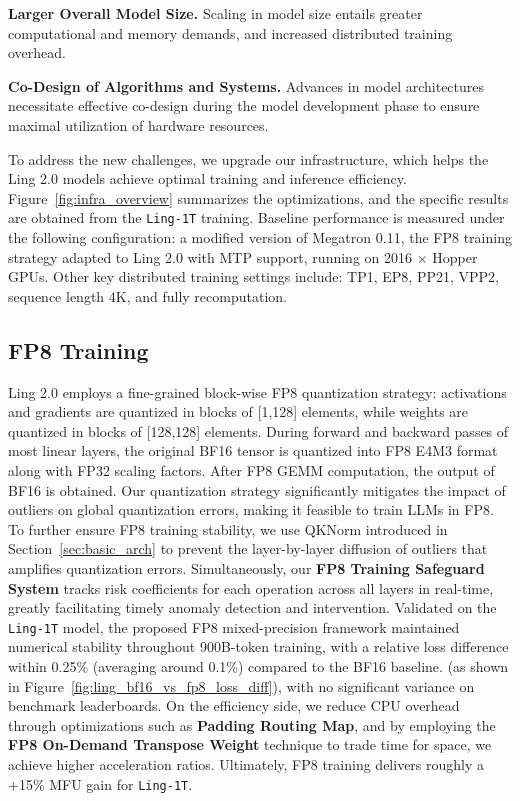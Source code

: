 \textbf{Larger Overall Model Size.} Scaling in model size entails greater computational and memory demands, and increased distributed training overhead.

\textbf{Co-Design of Algorithms and Systems.} Advances in model architectures necessitate effective co-design during the model development phase to ensure maximal utilization of hardware resources.

To address the new challenges, we upgrade our infrastructure, which helps the Ling 2.0 models achieve optimal training and inference efficiency. 
Figure~\ref{fig:infra_overview} summarizes the optimizations, and the specific results are obtained from the \texttt{Ling-1T} training.
Baseline performance is measured under the following configuration: a modified version of Megatron 0.11, the FP8 training strategy adapted to Ling 2.0 with MTP support, running on 2016 $\times$ Hopper GPUs.
Other key distributed training settings include: TP1, EP8, PP21, VPP2, sequence length 4K, and fully recomputation.

\subsection{FP8 Training}

Ling 2.0 employs a fine-grained block-wise FP8 quantization strategy: activations and gradients are quantized in blocks of [1,128] elements, while weights are quantized in blocks of [128,128] elements. During forward and backward passes of most linear layers, the original BF16 tensor is quantized into FP8 E4M3 format along with FP32 scaling factors. 
After FP8 GEMM computation, the output of BF16 is obtained.
Our quantization strategy significantly mitigates the impact of outliers on global quantization errors, making it feasible to train LLMs in FP8. To further ensure FP8 training stability, we use QKNorm introduced in Section~\ref{sec:basic_arch} to prevent the layer-by-layer diffusion of outliers that amplifies quantization errors. 
Simultaneously, our \textbf{FP8 Training Safeguard System} tracks risk coefficients for each operation across all layers in real-time, greatly facilitating timely anomaly detection and intervention. 
Validated on the \texttt{Ling-1T} model, the proposed FP8 mixed-precision framework maintained numerical stability throughout 900B-token training, with a relative loss difference within 0.25\% (averaging around 0.1\%) compared to the BF16 baseline. (as shown in Figure~\ref{fig:ling_bf16_vs_fp8_loss_diff}), with no significant variance on benchmark leaderboards.
On the efficiency side, we reduce CPU overhead through optimizations such as \textbf{Padding Routing Map}, and by employing the \textbf{FP8 On-Demand Transpose Weight} technique to trade time for space, we achieve higher acceleration ratios. Ultimately, FP8 training delivers roughly a +15\% MFU gain for \texttt{Ling-1T}.

